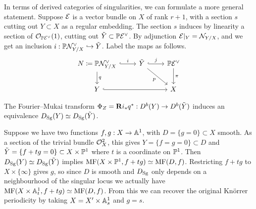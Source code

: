 In terms of derived categories of singularities, we can formulate a more general
statement. Suppose $\calE$ is a vector bundle on $X$ of rank $r+1$, with a
section $s$ cutting out $Y\subset X$ as a regular embedding. The section $s$
induces by linearity a section of $\O_{\P\calE^\vee}(1)$, cutting out
$\tilde Y\subset\P\calE^\vee$. By adjunction $\calE|_Y=\calN_{Y/X}$, and we get
an inclusion $i:\P\calN^\vee_{Y/X}\hookrightarrow\tilde Y$. Label the maps as
follows.
\begin{equation*}
    \begin{tikzcd}
        N\coloneqq\P\calN_{Y/X}^\vee \ar[d,"q"] \ar[r,hook,"i"] &
        \tilde Y \ar[r,hook,"j"] \ar[dr,"p"'] &
        \P\calE^\vee \ar[d,"\pi"] \\
        Y \ar[rr,hook] & & X
    \end{tikzcd}
\end{equation*}

\begin{theorem}{\cite[Thm 2.1]{OrlovKnorrer}}{}
    The Fourier--Mukai transform $\Phi_Z=\dR i_*q^*:D^b(Y)\to D^b(\tilde Y)$
    induces an equivalence $D_\Sg(Y)\simeq D_\Sg(\tilde Y)$.
\end{theorem}

\begin{example}{}{}
    Suppose we have two functions $f,g:X\to\A^1$, with $D=\{g=0\}\subset X$
    smooth. As a section of the trivial bundle $\O_X^2$, this gives
    $Y=\{f=g=0\}\subset D$ and $\tilde Y=\{f+tg=0\}\subset X\times\P^1$
    where $t$ is a coordinate on $\P^1$. Then $D_\Sg(Y)\simeq D_\Sg(\tilde Y)$
    implies $\MF(X\times\P^1,f+tg)\simeq\MF(D,f)$. Restricting $f+tg$ to
    $X\times\{\infty\}$ gives $g$, so since $D$ is smooth and $D_\Sg$ only
    depends on a neighbourhood of the singular locus we actually have
    $\MF(X\times\A^1_t,f+tg)\simeq\MF(D,f)$. From this we can recover the
    original Kn\"orrer periodicity by taking $X=X'\times\A^1_s$ and $g=s$.
\end{example}

